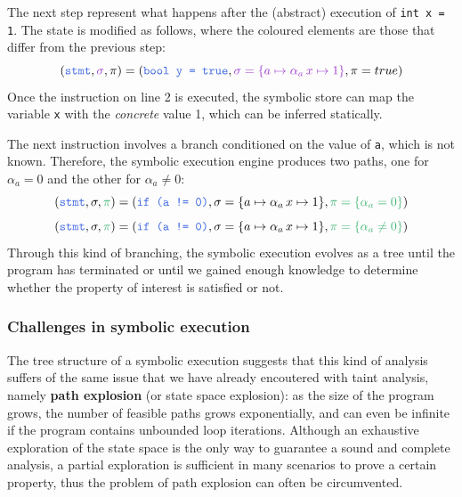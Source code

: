 \documentclass[12pt,a4paper]{book}
\theoremstyle{definition}
\begin{document}
	The next step represent what happens after the (abstract) execution of \texttt{int x = 1}. The state is modified as follows, where the coloured elements are those that differ from the previous step:
	\[
	(\textcolor{blue}{\texttt{stmt}}, \textcolor{violet}{\sigma}, \pi) = (\textcolor{blue}{\texttt{bool y = true}}, \textcolor{violet}{\sigma = \{a \mapsto \alpha_a\, x \mapsto 1\}}, \pi = true)
	\] 
	Once the instruction on line 2 is executed, the symbolic store can map the variable \texttt{x} with the \textit{concrete} value 1, which can be inferred statically.
	
	The next instruction involves a branch conditioned on the value of \texttt{a}, which is not known. Therefore, the symbolic execution engine produces two paths, one for $\alpha_a = 0$ and the other for $\alpha_a \neq 0$:
	\[
	(\textcolor{blue}{\texttt{stmt}}, \sigma, \textcolor{green}{\pi}) = (\textcolor{blue}{\texttt{if (a != 0)}}, \sigma = \{a \mapsto \alpha_a\, x \mapsto 1\}, \textcolor{green}{\pi = \{\alpha_a = 0\}})
	\]
	\[
	(\textcolor{blue}{\texttt{stmt}}, \sigma, \textcolor{green}{\pi}) = (\textcolor{blue}{\texttt{if (a != 0)}}, \sigma = \{a \mapsto \alpha_a\, x \mapsto 1\}, \textcolor{green}{\pi = \{\alpha_a \neq 0\}})
	\]
	Through this kind of branching, the symbolic execution evolves as a tree until the program has terminated or until we gained enough knowledge to determine whether the property of interest is satisfied or not.
	\subsubsection{Challenges in symbolic execution}
	The tree structure of a symbolic execution suggests that this kind of analysis suffers of the same issue that we have already encoutered with taint analysis, namely \textbf{path explosion} (or state space explosion): as the size of the program grows, the number of feasible paths grows exponentially, and can even be infinite if the program contains unbounded loop iterations. Although an exhaustive exploration of the state space is the only way to guarantee a sound and complete analysis, a partial exploration is sufficient in many scenarios to prove a certain property, thus the problem of path explosion can often be circumvented.
	
\end{document}
